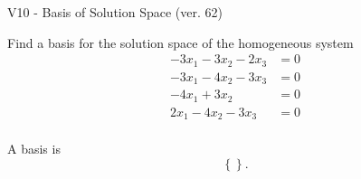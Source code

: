 \begin{exercise}
  \begin{exerciseTitle}V10 - Basis of Solution Space (ver. 62)\end{exerciseTitle}
  \begin{exerciseStatement}
    Find a basis for the solution space of the homogeneous system 
\begin{align*}
 -3 x_ 1 -3 x_ 2 -2 x_ 3 &= 0  \\ 
  -3 x_ 1 -4 x_ 2 -3 x_ 3 &= 0  \\ 
  -4 x_ 1 + 3 x_ 2 &= 0  \\ 
  2 x_ 1 -4 x_ 2 -3 x_ 3 &= 0  \\ 
 \end{align*}


 
  \end{exerciseStatement}

  \begin{exerciseAnswer}
   A basis is   
\[\left\{\right\}.\]

  


  \end{exerciseAnswer}
\end{exercise}